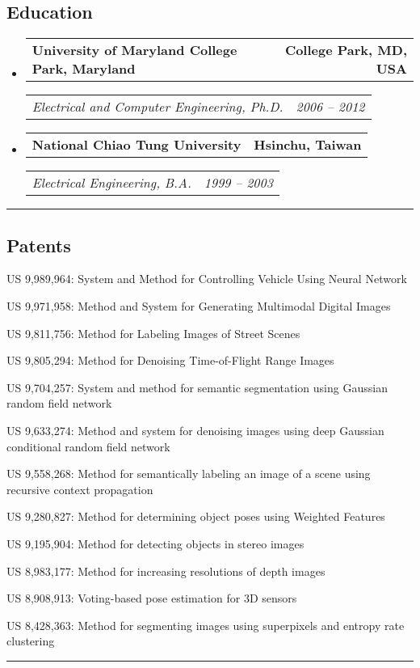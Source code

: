 \documentclass[10pt,letterpaper]{article}
\makeatletter
\newcommand{\headerrow}[2]
{\begin{tabular*}{\linewidth}{l@{\extracolsep{\fill}}r}
	#1 &
	#2 \\
\end{tabular*}}
\makeatother
\begin{document}
\subsection*{Education}
\begin{itemize}
	\parskip=0.1em
	\item
	\headerrow
	{\textbf{University of Maryland College Park, Maryland}}
	{\textbf{College Park, MD, USA}}
	\headerrow
	{\emph{Electrical and Computer Engineering, Ph.D.}}
	{\emph{2006 -- 2012}}
	\item
	\headerrow
	{\textbf{National Chiao Tung University}}
	{\textbf{Hsinchu, Taiwan}}
	\headerrow
	{\emph{Electrical Engineering, B.A.}}
	{\emph{1999 -- 2003}}
\end{itemize}
%
\hrule
\vspace{-0.4em}
\subsection*{Patents}
\begin{itemize*}
	
\item US 9,989,964: System and Method for Controlling Vehicle Using Neural Network

\item US 9,971,958: Method and System for Generating Multimodal Digital Images

\item US 9,811,756: Method for Labeling Images of Street Scenes

\item US 9,805,294: Method for Denoising Time-of-Flight Range Images

\item US 9,704,257: System and method for semantic segmentation using Gaussian random field network

\item US 9,633,274: Method and system for denoising images using deep Gaussian conditional random field network

\item US 9,558,268: Method for semantically labeling an image of a scene using recursive context propagation

\item US 9,280,827: Method for determining object poses using Weighted Features

\item US 9,195,904: Method for detecting objects in stereo images

\item US 8,983,177: Method for increasing resolutions of depth images

\item US 8,908,913: Voting-based pose estimation for 3D sensors

\item US 8,428,363: Method for segmenting images using superpixels and entropy rate clustering
\end{itemize*}
%
\hrule
\end{document}
